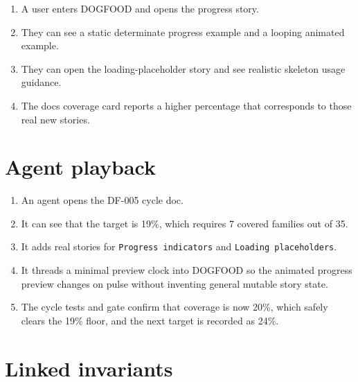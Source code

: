 \begin{enumerate}
\def\labelenumi{\arabic{enumi}.}
\tightlist
\item
  A user enters DOGFOOD and opens the progress story.
\item
  They can see a static determinate progress example and a looping animated example.
\item
  They can open the loading-placeholder story and see realistic skeleton usage guidance.
\item
  The docs coverage card reports a higher percentage that corresponds to those real new stories.
\end{enumerate}

\section{Agent playback}\label{record-067-agent-playback}

\begin{enumerate}
\def\labelenumi{\arabic{enumi}.}
\tightlist
\item
  An agent opens the DF-005 cycle doc.
\item
  It can see that the target is 19\%, which requires 7 covered families out of 35.
\item
  It adds real stories for \texttt{P\allowbreak{}r\allowbreak{}o\allowbreak{}g\allowbreak{}r\allowbreak{}e\allowbreak{}s\allowbreak{}s\allowbreak{} \allowbreak{}i\allowbreak{}n\allowbreak{}d\allowbreak{}i\allowbreak{}c\allowbreak{}a\allowbreak{}t\allowbreak{}o\allowbreak{}r\allowbreak{}s} and \texttt{L\allowbreak{}o\allowbreak{}a\allowbreak{}d\allowbreak{}i\allowbreak{}n\allowbreak{}g\allowbreak{} \allowbreak{}p\allowbreak{}l\allowbreak{}a\allowbreak{}c\allowbreak{}e\allowbreak{}h\allowbreak{}o\allowbreak{}l\allowbreak{}d\allowbreak{}e\allowbreak{}r\allowbreak{}s}.
\item
  It threads a minimal preview clock into DOGFOOD so the animated progress preview changes on pulse without inventing general mutable story state.
\item
  The cycle tests and gate confirm that coverage is now 20\%, which safely clears the 19\% floor, and the next target is recorded as 24\%.
\end{enumerate}

\section{Linked invariants}\label{record-067-linked-invariants}

